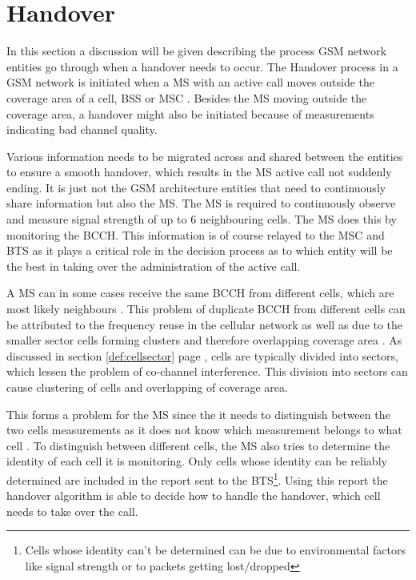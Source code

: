\section{Handover}
\label{sec:handover}
In this section a discussion will be given describing the process GSM network entities go through when a handover needs to occur. The Handover process in a GSM network is initiated when a MS with an active call moves outside the coverage area of a cell, BSS or MSC \cite{GSMArchitectureProtocolsServices,wirelesstelcoMullet,Eisenblatter}. Besides the MS moving outside the coverage area, a handover might also be initiated because of measurements indicating bad channel quality\cite{GSMArchitectureProtocolsServices}. 

Various information needs to be migrated across and shared between the entities to ensure a smooth handover, which results in the MS active call not suddenly ending. It is just not the GSM architecture entities that need to continuously share information but also the MS. The MS is required to continuously observe and measure signal strength of up to 6 neighbouring cells. The MS does this by monitoring the BCCH\cite{GSMArchitectureProtocolsServices,wirelesstelcoMullet}. This information is of course relayed to the MSC and BTS as it plays a critical role in the decision process as to which entity will be the best in taking over the administration of the active call\cite{GSMArchitectureProtocolsServices,wirelesstelcoMullet}.

A MS can in some cases receive the same BCCH from different cells, which are most likely neighbours \cite{GSMArchitectureProtocolsServices}. This problem of duplicate BCCH from different cells can be attributed to the frequency reuse in the cellular network as well as due to the smaller sector cells forming clusters and therefore overlapping coverage area \cite{GSMArchitectureProtocolsServices}. As discussed in section \ref{def:cellsector} page \pageref{def:cellsector}, cells are typically divided into sectors, which lessen the problem of co-channel interference. This division into sectors can cause clustering of cells and overlapping of coverage area.

This forms a problem for the MS since the it needs to distinguish between the two cells measurements as it does not know which measurement belongs to what cell \cite{GSMArchitectureProtocolsServices}. To distinguish between different cells, the MS also tries to determine the identity of each cell it is monitoring. Only cells whose identity can be reliably determined are included in the report sent to the BTS\cite{Eisenblatter,GSMArchitectureProtocolsServices,wirelesstelcoMullet}\footnote{Cells whose identity can't be determined can be due to environmental factors like signal strength or to packets getting lost/dropped}. Using this report the handover algorithm is able to decide how to handle the handover, which cell needs to take over the call\cite{Eisenblatter,GSMArchitectureProtocolsServices,wirelesstelcoMullet}.

